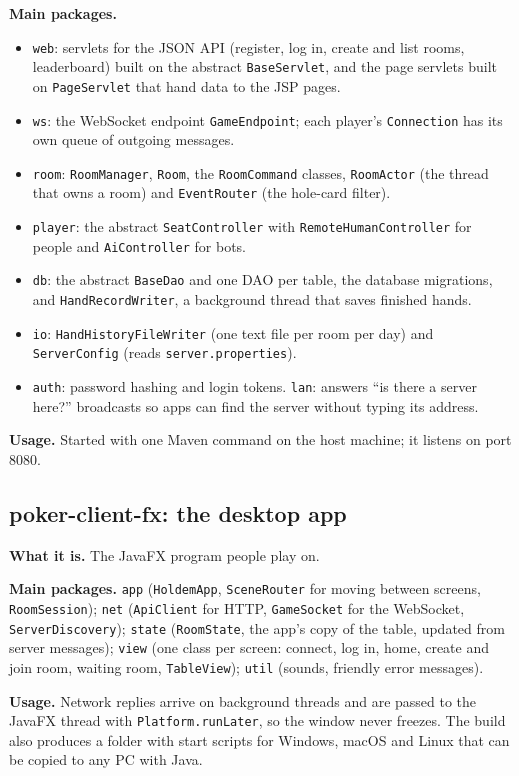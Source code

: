\documentclass[12pt,a4paper]{article}
\newcommand{\cls}[1]{\texttt{#1}}
\begin{document}
\textbf{Main packages.}
\begin{itemize}
\item \cls{web}: servlets for the JSON API (register, log in, create and list rooms,
leaderboard) built on the abstract \cls{BaseServlet}, and the page servlets built on
\cls{PageServlet} that hand data to the JSP pages.
\item \cls{ws}: the WebSocket endpoint \cls{GameEndpoint}; each player's \cls{Connection} has
its own queue of outgoing messages.
\item \cls{room}: \cls{RoomManager}, \cls{Room}, the \cls{RoomCommand} classes, \cls{RoomActor}
(the thread that owns a room) and \cls{EventRouter} (the hole-card filter).
\item \cls{player}: the abstract \cls{SeatController} with \cls{RemoteHumanController} for
people and \cls{AiController} for bots.
\item \cls{db}: the abstract \cls{BaseDao} and one DAO per table, the database migrations, and
\cls{HandRecordWriter}, a background thread that saves finished hands.
\item \cls{io}: \cls{HandHistoryFileWriter} (one text file per room per day) and
\cls{ServerConfig} (reads \cls{server.properties}).
\item \cls{auth}: password hashing and login tokens. \cls{lan}: answers ``is there a server
here?'' broadcasts so apps can find the server without typing its address.
\end{itemize}

\textbf{Usage.} Started with one Maven command on the host machine; it listens on port 8080.

\subsection{poker-client-fx: the desktop app}
\textbf{What it is.} The JavaFX program people play on.

\textbf{Main packages.} \cls{app} (\cls{HoldemApp}, \cls{SceneRouter} for moving between
screens, \cls{RoomSession}); \cls{net} (\cls{ApiClient} for HTTP, \cls{GameSocket} for the
WebSocket, \cls{ServerDiscovery}); \cls{state} (\cls{RoomState}, the app's copy of the table,
updated from server messages); \cls{view} (one class per screen: connect, log in, home, create
and join room, waiting room, \cls{TableView}); \cls{util} (sounds, friendly error messages).

\textbf{Usage.} Network replies arrive on background threads and are passed to the JavaFX
thread with \cls{Platform.runLater}, so the window never freezes. The build also produces a
folder with start scripts for Windows, macOS and Linux that can be copied to any PC with Java.
\end{document}
